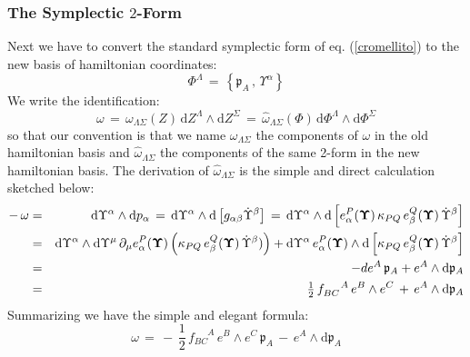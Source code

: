 \documentclass[10pt,a4paper]{article}
\newcommand{\ft}[2]{{\textstyle\frac{#1}{#2}}}
\begin{document}
\subsubsection{The Symplectic $2$-Form}
Next we have to convert the standard symplectic form of eq. (\ref{cromellito}) to the new basis of hamiltonian coordinates:
\begin{equation}\label{newhamilcord}
  \Phi^\Lambda \, = \, \left\{\mathfrak{p}_A \, , \, \Upsilon^\alpha\right\}
\end{equation}
We write the identification:
\begin{equation}\label{crulino}
  \omega \, = \, \omega_{\Lambda\Sigma}(Z)\, \mathrm{d}Z^\Lambda \wedge \mathrm{d}Z^\Sigma \, = \, \hat{\omega}_{\Lambda\Sigma}(\Phi) \,
  \mathrm{d}\Phi^\Lambda \wedge \mathrm{d}\Phi^\Sigma
\end{equation}
so that our convention is that we name $\omega_{\Lambda\Sigma}$
the components of $\omega$ in the old hamiltonian basis and
$\hat{\omega}_{\Lambda\Sigma}$ the components of the same 2-form
in the new hamiltonian basis. The derivation of $\hat{\omega}_{\Lambda\Sigma}$ is the simple and direct calculation sketched below:
\begin{eqnarray}
\label{cicorietta}
  -\,\omega &=& \mathrm{d}\Upsilon^\alpha \wedge \mathrm{d}p_\alpha \, = \,\mathrm{d}\Upsilon^\alpha \wedge \mathrm{d}\left[g_{\alpha\beta} \dot{\Upsilon}^\beta\right]\, = \,\mathrm{d}\Upsilon^\alpha \wedge \mathrm{d}\left[e^P_\alpha(\boldsymbol{\Upsilon})\,\kappa_{PQ}
  \,e^Q_\beta(\boldsymbol{\Upsilon}) \,   \dot{\Upsilon}^\beta\right] \nonumber\\
  \null &=& \mathrm{d}\Upsilon^\alpha \wedge \mathrm{d}\Upsilon^\mu \, \partial_\mu e^P_\alpha(\boldsymbol{\Upsilon}) \left (\kappa_{PQ}
  \,e^Q_\beta(\boldsymbol{\Upsilon})\,\dot{\Upsilon}^\beta)\right)+ \mathrm{d}\Upsilon^\alpha \, e^P_\alpha(\boldsymbol{\Upsilon}) \wedge \mathrm{d}\left[\kappa_{PQ}
  \,e^Q_\beta(\boldsymbol{\Upsilon})\,\dot{\Upsilon}^\beta\right]     \nonumber\\
  \null &=& - de^A \,\mathfrak{p}_A + e^A \wedge \mathrm{d}\mathfrak{p}_A \nonumber\\
  \null &=& \ft 12 \, f^{\phantom{BC}A}_{BC} \,e^B \wedge e^C \, + \, e^A \wedge \mathrm{d}\mathfrak{p}_A
\end{eqnarray}
Summarizing we have the simple and elegant formula:
\begin{equation}\label{crautibavaresi}
  \omega \, = \, - \, \ft 12 \, f^{\phantom{BC}A}_{BC} \,e^B \wedge e^C \,\mathfrak{p}_A \, - \, e^A \wedge \mathrm{d}\mathfrak{p}_A
\end{equation}
\end{document}
